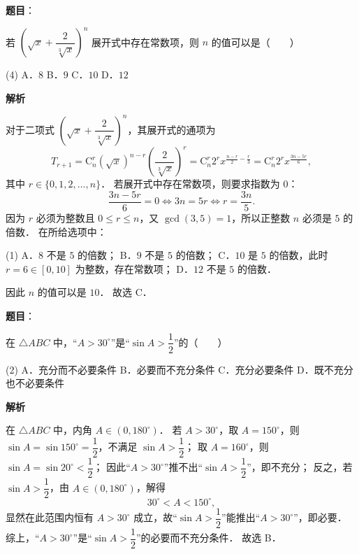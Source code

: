 \begin{answer}

\textbf{题目}：

若 $\left(\sqrt{x} + \dfrac{2}{\sqrt[3]{x}}\right)^n$ 展开式中存在常数项，则 $n$ 的值可以是\mbox{（　　）}

\begin{gkopts}(4)
\task A．$8$
\task B．$9$
\task C．$10$
\task D．$12$
\end{gkopts}

\textbf{解析}

对于二项式 $\left(\sqrt{x} + \dfrac{2}{\sqrt[3]{x}}\right)^n$，其展开式的通项为
\nopagebreak[4]
\[
T_{r+1} = \mathrm{C}_n^r (\sqrt{x})^{n-r} \left(\frac{2}{\sqrt[3]{x}}\right)^r = \mathrm{C}_n^r 2^r x^{\frac{n-r}{2} - \frac{r}{3}} = \mathrm{C}_n^r 2^r x^{\frac{3n-5r}{6}},
\]
其中 $r \in \{0, 1, 2, \dots, n\}$．
若展开式中存在常数项，则要求指数为 $0$：
\nopagebreak[4]
\[
\frac{3n - 5r}{6} = 0 \iff 3n = 5r \iff r = \frac{3n}{5}.
\]
因为 $r$ 必须为整数且 $0 \leqslant r \leqslant n$，又 $\gcd(3, 5) = 1$，所以正整数 $n$ 必须是 $5$ 的倍数．
在所给选项中：
\begin{gkopts}(1)
\task A．$8$ 不是 $5$ 的倍数；
\task B．$9$ 不是 $5$ 的倍数；
\task C．$10$ 是 $5$ 的倍数，此时 $r = 6 \in [0, 10]$ 为整数，存在常数项；
\task D．$12$ 不是 $5$ 的倍数．
\end{gkopts}
因此 $n$ 的值可以是 $10$．
故选 C．


\end{answer}
\begin{answer}

\textbf{题目}：

在 $\triangle ABC$ 中，“$A > 30^\circ$”是“$\sin A > \dfrac{1}{2}$”的\mbox{（　　）}

\begin{gkopts}(2)
\task A．充分而不必要条件
\task B．必要而不充分条件
\task C．充分必要条件
\task D．既不充分也不必要条件
\end{gkopts}

\textbf{解析}

在 $\triangle ABC$ 中，内角 $A \in (0, 180^\circ)$．
若 $A > 30^\circ$，取 $A = 150^\circ$，则 $\sin A = \sin 150^\circ = \dfrac{1}{2}$，不满足 $\sin A > \dfrac{1}{2}$；
取 $A = 160^\circ$，则 $\sin A = \sin 20^\circ < \dfrac{1}{2}$；
因此“$A > 30^\circ$”推不出“$\sin A > \dfrac{1}{2}$”，即不充分；
反之，若 $\sin A > \dfrac{1}{2}$，由 $A \in (0, 180^\circ)$，解得
\nopagebreak[4]
\[
30^\circ < A < 150^\circ,
\]
显然在此范围内恒有 $A > 30^\circ$ 成立，故“$\sin A > \dfrac{1}{2}$”能推出“$A > 30^\circ$”，即必要．
综上，“$A > 30^\circ$”是“$\sin A > \dfrac{1}{2}$”的必要而不充分条件．
故选 B．


\end{answer}
